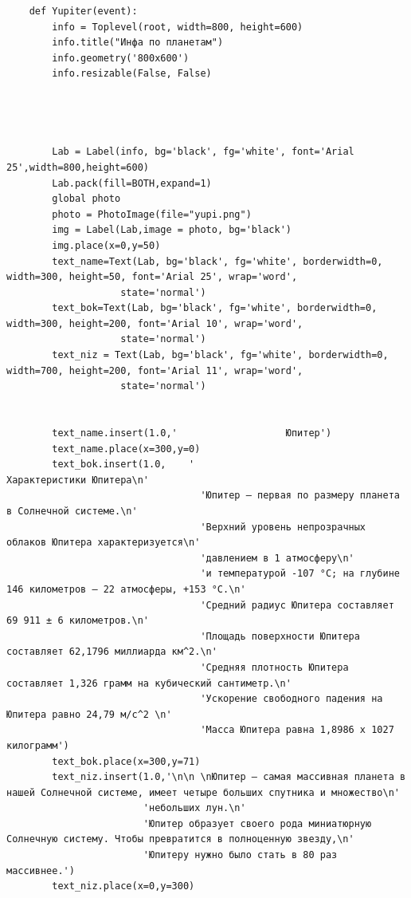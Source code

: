 \documentclass[11pt,a4paper]{report}
\begin{document}
\begin{verbatim}
    def Yupiter(event): 
        info = Toplevel(root, width=800, height=600)
        info.title("Инфа по планетам")
        info.geometry('800x600')
        info.resizable(False, False)  
        
        
        
    
        Lab = Label(info, bg='black', fg='white', font='Arial 25',width=800,height=600)
        Lab.pack(fill=BOTH,expand=1)
        global photo
        photo = PhotoImage(file="yupi.png")
        img = Label(Lab,image = photo, bg='black')
        img.place(x=0,y=50)
        text_name=Text(Lab, bg='black', fg='white', borderwidth=0, width=300, height=50, font='Arial 25', wrap='word',
                    state='normal')  
        text_bok=Text(Lab, bg='black', fg='white', borderwidth=0, width=300, height=200, font='Arial 10', wrap='word',
                    state='normal')  
        text_niz = Text(Lab, bg='black', fg='white', borderwidth=0, width=700, height=200, font='Arial 11', wrap='word',
                    state='normal')  
    
       
        text_name.insert(1.0,'                   Юпитер')
        text_name.place(x=300,y=0)
        text_bok.insert(1.0,    '                                           Характеристики Юпитера\n' 
                                  'Юпитер – первая по размеру планета в Солнечной системе.\n'
                                  'Верхний уровень непрозрачных облаков Юпитера характеризуется\n'
                                  'давлением в 1 атмосферу\n'
                                  'и температурой -107 °C; на глубине 146 километров – 22 атмосферы, +153 °C.\n'
                                  'Средний радиус Юпитера составляет 69 911 ± 6 километров.\n'
                                  'Площадь поверхности Юпитера составляет 62,1796 миллиарда км^2.\n'
                                  'Средняя плотность Юпитера составляет 1,326 грамм на кубический сантиметр.\n'
                                  'Ускорение свободного падения на Юпитера равно 24,79 м/c^2 \n'
                                  'Масса Юпитера равна 1,8986 х 1027 килограмм')
        text_bok.place(x=300,y=71)        
        text_niz.insert(1.0,'\n\n \nЮпитер — самая массивная планета в нашей Солнечной системе, имеет четыре больших спутника и множество\n'
                        'небольших лун.\n'
                        'Юпитер образует своего рода миниатюрную Солнечную систему. Чтобы превратится в полноценную звезду,\n'
                        'Юпитеру нужно было стать в 80 раз массивнее.')
        text_niz.place(x=0,y=300)



\end{verbatim}
\end{document}
